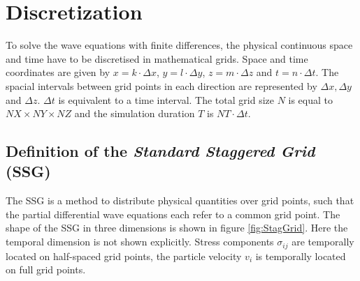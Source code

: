 \documentclass[pdftex,a4paper,parskip,listof=totoc,bibliography=totoc,onehalfspacing,12pt]{scrreprt}
\begin{document}
\chapter{Discretization}

To solve the wave equations with finite differences, the physical continuous space and time have to be discretised in mathematical grids. Space and time coordinates are given by $x=k \cdot \Delta x$, $y=l \cdot \Delta y$, $z=m \cdot \Delta z$ and $t=n \cdot \Delta t$. The spacial intervals between grid points in each direction are represented by $\Delta x, \Delta y$ and $\Delta z$. $\Delta t$ is equivalent to a time interval. The total grid size $N$ is equal to $NX \times NY \times NZ$ and the simulation duration $T$ is $NT \cdot \Delta t$.

\section{Definition of the \textit{Standard Staggered Grid} (SSG)} \label{sec:SSG}

The SSG \citep{virieux1986p,levander1988fourth} is a method to distribute physical quantities over grid points, such that the partial differential wave equations each refer to a common grid point. The shape of the SSG in three dimensions is shown in figure \ref{fig:StagGrid}. Here the temporal dimension is not shown explicitly. Stress components $\sigma_{ij}$ are temporally located on half-spaced grid points, the particle velocity $v_{i}$ is temporally located on full grid points.
\end{document}
